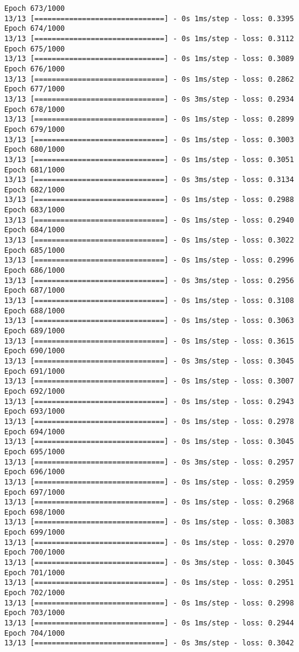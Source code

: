 \documentclass[11pt]{article}
\begin{document}
\begin{Verbatim}[commandchars=\\\{\}]
Epoch 673/1000
13/13 [==============================] - 0s 1ms/step - loss: 0.3395
Epoch 674/1000
13/13 [==============================] - 0s 1ms/step - loss: 0.3112
Epoch 675/1000
13/13 [==============================] - 0s 1ms/step - loss: 0.3089
Epoch 676/1000
13/13 [==============================] - 0s 1ms/step - loss: 0.2862
Epoch 677/1000
13/13 [==============================] - 0s 3ms/step - loss: 0.2934
Epoch 678/1000
13/13 [==============================] - 0s 1ms/step - loss: 0.2899
Epoch 679/1000
13/13 [==============================] - 0s 1ms/step - loss: 0.3003
Epoch 680/1000
13/13 [==============================] - 0s 1ms/step - loss: 0.3051
Epoch 681/1000
13/13 [==============================] - 0s 3ms/step - loss: 0.3134
Epoch 682/1000
13/13 [==============================] - 0s 1ms/step - loss: 0.2988
Epoch 683/1000
13/13 [==============================] - 0s 1ms/step - loss: 0.2940
Epoch 684/1000
13/13 [==============================] - 0s 1ms/step - loss: 0.3022
Epoch 685/1000
13/13 [==============================] - 0s 1ms/step - loss: 0.2996
Epoch 686/1000
13/13 [==============================] - 0s 3ms/step - loss: 0.2956
Epoch 687/1000
13/13 [==============================] - 0s 1ms/step - loss: 0.3108
Epoch 688/1000
13/13 [==============================] - 0s 1ms/step - loss: 0.3063
Epoch 689/1000
13/13 [==============================] - 0s 1ms/step - loss: 0.3615
Epoch 690/1000
13/13 [==============================] - 0s 3ms/step - loss: 0.3045
Epoch 691/1000
13/13 [==============================] - 0s 1ms/step - loss: 0.3007
Epoch 692/1000
13/13 [==============================] - 0s 1ms/step - loss: 0.2943
Epoch 693/1000
13/13 [==============================] - 0s 1ms/step - loss: 0.2978
Epoch 694/1000
13/13 [==============================] - 0s 1ms/step - loss: 0.3045
Epoch 695/1000
13/13 [==============================] - 0s 3ms/step - loss: 0.2957
Epoch 696/1000
13/13 [==============================] - 0s 1ms/step - loss: 0.2959
Epoch 697/1000
13/13 [==============================] - 0s 1ms/step - loss: 0.2968
Epoch 698/1000
13/13 [==============================] - 0s 1ms/step - loss: 0.3083
Epoch 699/1000
13/13 [==============================] - 0s 1ms/step - loss: 0.2970
Epoch 700/1000
13/13 [==============================] - 0s 3ms/step - loss: 0.3045
Epoch 701/1000
13/13 [==============================] - 0s 1ms/step - loss: 0.2951
Epoch 702/1000
13/13 [==============================] - 0s 1ms/step - loss: 0.2998
Epoch 703/1000
13/13 [==============================] - 0s 1ms/step - loss: 0.2944
Epoch 704/1000
13/13 [==============================] - 0s 3ms/step - loss: 0.3042

\end{Verbatim}
\end{document}
